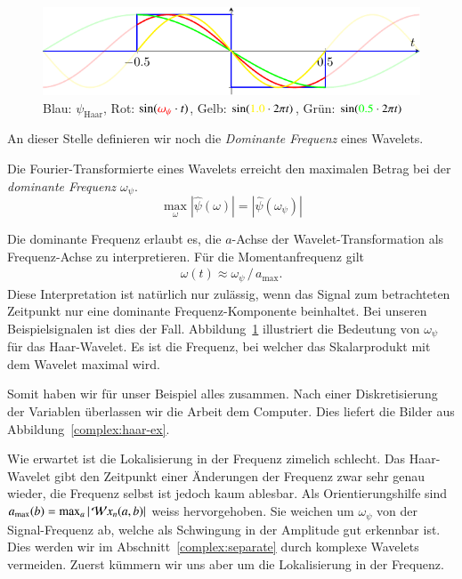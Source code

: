 \begin{figure}
	\centering
	\includegraphics{papers/complex/images/haar_dom.pdf}
	
	\caption{Blau: $\psi_\text{Haar}$, Rot: $\sin ({\color{red}\omega_\psi}\cdot t)$, Gelb: $\sin ({\color{yellow}1.0}\cdot 2\pi t)$, Grün: $\sin ({\color{green}0.5}\cdot 2\pi t)$}
	\label{complex:dom-freq}
\end{figure}
An dieser Stelle definieren wir noch die \emph{Dominante Frequenz} eines Wavelets.
\begin{definition}
	Die Fourier-Transformierte eines Wavelets erreicht den maximalen Betrag bei der \emph{dominante Frequenz $\omega_\psi$}.
	\begin{equation}
		\max_{\omega}\left|\hat\psi(\omega)\right| = \left|\hat\psi(\omega_\psi)\right|
	\end{equation}
	
\end{definition}

Die dominante Frequenz erlaubt es, die $a$-Achse der Wavelet-Transformation als Frequenz-Achse zu interpretieren.
Für die Momentanfrequenz gilt
\begin{align}
	\omega(t) \approx \omega_\psi\,/\,a_\text{max}.
\end{align}
Diese Interpretation ist natürlich nur zulässig, wenn das Signal zum betrachteten Zeitpunkt nur eine dominante Frequenz-Komponente beinhaltet.
Bei unseren Beispielsignalen ist dies der Fall.
Abbildung~\ref{complex:dom-freq} illustriert die Bedeutung von $\omega_\psi$ für das Haar-Wavelet.
Es ist die Frequenz, bei welcher das Skalarprodukt mit dem Wavelet maximal wird.

Somit haben wir für unser Beispiel alles zusammen.
Nach einer Diskretisierung der Variablen überlassen wir die Arbeit dem Computer.
Dies liefert die Bilder aus Abbildung~\ref{complex:haar-ex}.

Wie erwartet ist die Lokalisierung in der Frequenz zimelich schlecht.
Das Haar-Wavelet gibt den Zeitpunkt einer Änderungen der Frequenz zwar sehr genau wieder, die Frequenz selbst ist jedoch kaum ablesbar.
Als Orientierungshilfe sind $a_\text{max} (b) = \max_a{|\Wave x_n(a,b)|}$ weiss hervorgehoben.
Sie weichen um $\omega_\psi$ von der Signal-Frequenz ab, welche als Schwingung in der Amplitude gut erkennbar ist.
Dies werden wir im Abschnitt~\ref{complex:separate} durch komplexe Wavelets vermeiden.
Zuerst kümmern wir uns aber um die Lokalisierung in der Frequenz.
